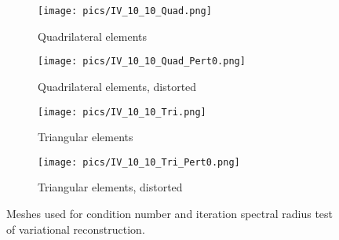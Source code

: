 \begin{figure}[htbp]
   \centering
   \begin{subfigure}{0.4\textwidth}
       \texttt{[image: pics/IV\_10\_10\_Quad.png]}
       \caption[]{Quadrilateral elements}
   \end{subfigure}
   \begin{subfigure}{0.4\textwidth}
       \texttt{[image: pics/IV\_10\_10\_Quad\_Pert0.png]}
       \caption[]{Quadrilateral elements, distorted}
   \end{subfigure}
   \begin{subfigure}{0.4\textwidth}
       \texttt{[image: pics/IV\_10\_10\_Tri.png]}
       \caption[]{Triangular elements}
   \end{subfigure}
   \begin{subfigure}{0.4\textwidth}
       \texttt{[image: pics/IV\_10\_10\_Tri\_Pert0.png]}
       \caption[]{Triangular elements, distorted}
   \end{subfigure}
   \caption{Meshes used for condition number and iteration spectral radius test of variational reconstruction.}
   \label{fig:meshes_test_cond}
\end{figure}

